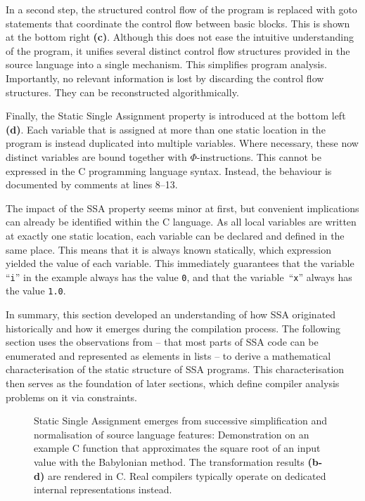     In a second step, the structured control flow of the program is replaced
    with goto statements that coordinate the control flow between basic blocks.
    This is shown at the bottom right {\bf(c)}.
    Although this does not ease the intuitive understanding of the program, it
    unifies several distinct control flow structures provided in the source
    language into a single mechanism.
    This simplifies program analysis.
    Importantly, no relevant information is lost by discarding the control flow
    structures.
    They can be reconstructed algorithmically.

    Finally, the Static Single Assignment property is introduced at the bottom
    left {\bf(d)}.
    Each variable that is assigned at more than one static location in the
    program is instead duplicated into multiple variables.
    Where necessary, these now distinct variables are bound together with
    $\Phi$-instructions.
    This cannot be expressed in the C programming language syntax.
    Instead, the behaviour is documented by comments at lines 8--13.

    The impact of the SSA property seems minor at first, but convenient
    implications can already be identified within the C language.
    As all local variables are written at exactly one static location, each
    variable can be declared and defined in the same place.
    This means that it is always known statically, which expression yielded the
    value of each variable.
    This immediately guarantees that the variable ``\texttt{i}'' in the example
    always has the value \texttt{0}, and that the variable~``\texttt{x}'' always
    has the value \texttt{1.0}.

    In summary, this section developed an understanding of how SSA originated
    historically and how it emerges during the compilation process.
    The following section uses the observations from
     -- that most parts of SSA code can be enumerated
    and represented as elements in lists -- to derive a mathematical
    characterisation of the static structure of SSA programs.
    This characterisation then serves as the foundation of later sections, which
    define compiler analysis problems on it via constraints.

\begin{figure}[p]
    
    \caption{Static Single Assignment emerges from successive simplification
             and normalisation of source language features: 
             Demonstration on an example C function that approximates the
             square root of an input value with the Babylonian method.
             The transformation results {\bf (b-d)} are rendered in C.
             Real compilers typically operate on
             dedicated internal representations instead.}
    \label{ssaexample}
\end{figure}

